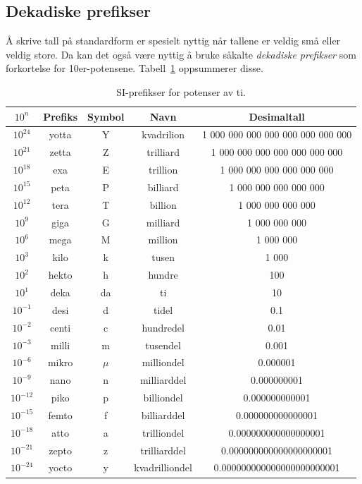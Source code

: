 \subsection*{Dekadiske prefikser}
Å skrive tall på standardform er spesielt nyttig når tallene er veldig små eller veldig store. Da kan det også være nyttig å bruke såkalte \textit{dekadiske prefikser} som forkortelse for 10er-potensene. Tabell~\ref{tab:dekPref} oppsummerer disse.

\begin{table}[h!]
\centering
\renewcommand{\arraystretch}{1.2}
\begin{tabular}{|c|c|c|c|c|}
\hline
\rowcolor{blue!20!black!10}
$10^n$ & Prefiks & Symbol & Navn & Desimaltall \\
\hline
$10^{24}$ & yotta & Y & kvadrilion & 1 000 000 000 000 000 000 000 000 \\
$10^{21}$ & zetta & Z & trilliard  & 1 000 000 000 000 000 000 000 \\
$10^{18}$ & exa   & E & trillion   & 1 000 000 000 000 000 000 \\
$10^{15}$ & peta  & P & billiard   & 1 000 000 000 000 000 \\
$10^{12}$ & tera  & T & billion    & 1 000 000 000 000 \\
$10^{9}$  & giga  & G & milliard   & 1 000 000 000 \\
$10^{6}$  & mega  & M & million    & 1 000 000 \\
$10^{3}$  & kilo  & k & tusen      & 1 000 \\
$10^{2}$  & hekto & h & hundre     & 100 \\
$10^{1}$  & deka  & da& ti         & 10 \\
$10^{-1}$ & desi  & d & tidel      & 0.1 \\
$10^{-2}$ & centi & c & hundredel  & 0.01 \\
$10^{-3}$ & milli & m & tusendel   & 0.001 \\
$10^{-6}$ & mikro & $\mu$ & milliondel & 0.000001 \\
$10^{-9}$ & nano  & n & milliarddel  & 0.000000001 \\
$10^{-12}$& piko  & p & billiondel   & 0.000000000001 \\
$10^{-15}$& femto & f & billiarddel  & 0.000000000000001 \\
$10^{-18}$& atto  & a & trilliondel  & 0.000000000000000001 \\
$10^{-21}$& zepto & z & trilliarddel & 0.000000000000000000001 \\
$10^{-24}$& yocto & y & kvadrilliondel & 0.000000000000000000000001 \\
\hline
\end{tabular}
\caption{SI-prefikser for potenser av ti.}
\label{tab:dekPref}
\end{table}

